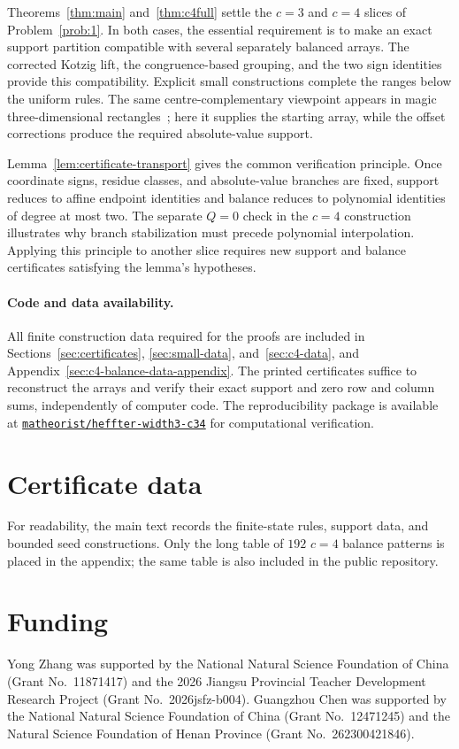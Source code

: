 Theorems~\ref{thm:main} and~\ref{thm:c4full} settle the $c=3$ and $c=4$ slices of
Problem~\ref{prob:1}. In both cases, the essential requirement is to make an exact support
partition compatible with several separately balanced arrays. The corrected Kotzig lift,
the congruence-based grouping, and the two sign identities provide this compatibility.
Explicit small constructions complete the ranges below the uniform rules.
The same centre-complementary viewpoint appears in magic three-dimensional
rectangles~\cite{Zhou2018JCD}; here it supplies the starting array, while the offset corrections
produce the required absolute-value support.

Lemma~\ref{lem:certificate-transport} gives the common verification principle. Once coordinate
signs, residue classes, and absolute-value branches are fixed, support reduces to affine
endpoint identities and balance reduces to polynomial identities of degree at most two.
The separate $Q=0$ check in the $c=4$ construction illustrates why branch stabilization must
precede polynomial interpolation. Applying this principle to another slice requires new
support and balance certificates satisfying the lemma's hypotheses.

\paragraph{Code and data availability.}
All finite construction data required for the proofs are included in Sections~\ref{sec:certificates},
\ref{sec:small-data}, and~\ref{sec:c4-data}, and Appendix~\ref{sec:c4-balance-data-appendix}.
The printed certificates suffice to reconstruct the arrays and verify their exact support
and zero row and column sums, independently of computer code.
The reproducibility package is available at
\href{https://github.com/matheorist/heffter-width3-c34}{\texttt{matheorist/heffter-width3-c34}}
for computational verification.

\appendix
\section{Certificate data}\label{app:certificate-data}
For readability, the main text records the finite-state rules, support data, and bounded seed
constructions. Only the long table of $192$ $c=4$ balance patterns is placed in the appendix;
the same table is also included in the public repository.


\section*{Funding}
\begingroup
\small
\begin{minipage}{0.92\textwidth}
\noindent Yong Zhang was supported by the National Natural Science Foundation of China
(Grant No.~11871417) and the 2026 Jiangsu Provincial Teacher Development Research
Project (Grant No.~2026jsfz-b004). Guangzhou Chen was supported by the National
Natural Science Foundation of China (Grant No.~12471245) and the Natural Science
Foundation of Henan Province (Grant No.~262300421846).
\end{minipage}
\endgroup

\begingroup
\footnotesize


\endgroup


